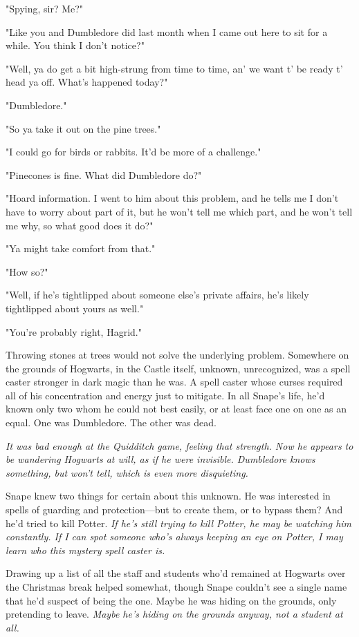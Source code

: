 "Spying, sir? Me?"

"Like you and Dumbledore did last month when I came out here to sit for a while. You think I don't notice?"

"Well, ya do get a bit high-strung from time to time, an' we want t' be ready t' head ya off. What's happened today?"

"Dumbledore."

"So ya take it out on the pine trees."

"I could go for birds or rabbits. It'd be more of a challenge."

"Pinecones is fine. What did Dumbledore do?"

"Hoard information. I went to him about this{\el} problem, and he tells me I don't have to worry about part of it, but he won't tell me which part, and he won't tell me why, so what good does it do?"

"Ya might take comfort from that."

"How so?"

"Well, if he's tightlipped about someone else's private affairs, he's likely tightlipped about yours as well."

"You're probably right, Hagrid."

Throwing stones at trees would not solve the underlying problem. Somewhere on the grounds of Hogwarts, in the Castle itself, unknown, unrecognized, was a spell caster stronger in dark magic than he was. A spell caster whose curses required all of his concentration and energy just to mitigate. In all Snape's life, he'd known only two whom he could not best easily, or at least face one on one as an equal. One was Dumbledore. The other was dead.

\emph{It was bad enough at the Quidditch game, feeling that strength. Now he appears to be wandering Hogwarts at will, as if he were invisible. Dumbledore knows something, but won't tell, which is even more disquieting.}

Snape knew two things for certain about this unknown. He was interested in spells of guarding and protection—but to create them, or to bypass them? And he'd tried to kill Potter. \emph{If he's still trying to kill Potter, he may be watching him constantly. If I can spot someone who's always keeping an eye on Potter, I may learn who this mystery spell caster is.}

Drawing up a list of all the staff and students who'd remained at Hogwarts over the Christmas break helped somewhat, though Snape couldn't see a single name that he'd suspect of being the one. Maybe he was hiding on the grounds, only pretending to leave. \emph{Maybe he's hiding on the grounds anyway, not a student at all.}

